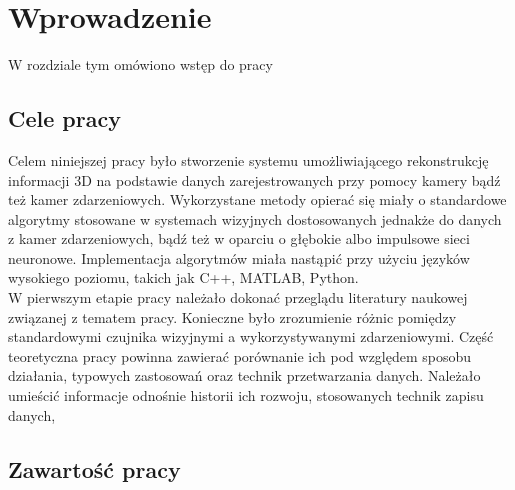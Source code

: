 \chapter{Wprowadzenie}
\label{cha:wprowadzenie}
W rozdziale tym omówiono wstęp do pracy
\section{Cele pracy}
\label{sec:celePracy}
Celem niniejszej pracy było stworzenie systemu umożliwiającego rekonstrukcję informacji 3D na podstawie danych zarejestrowanych przy pomocy kamery bądź też kamer zdarzeniowych. Wykorzystane metody opierać się miały o  standardowe algorytmy stosowane w systemach wizyjnych dostosowanych jednakże do danych z kamer zdarzeniowych, bądź też w oparciu o głębokie albo impulsowe sieci neuronowe. Implementacja algorytmów miała nastąpić przy użyciu języków wysokiego poziomu, takich jak C++, MATLAB, Python.\\
\indent W pierwszym etapie pracy należało dokonać przeglądu literatury naukowej związanej z tematem pracy. Konieczne było zrozumienie różnic pomiędzy standardowymi czujnika wizyjnymi a wykorzystywanymi zdarzeniowymi. Część teoretyczna pracy powinna zawierać porównanie ich pod względem sposobu działania, typowych zastosowań oraz technik przetwarzania danych. Należało umieścić informacje odnośnie historii ich rozwoju, stosowanych technik zapisu danych, 

\section{Zawartość pracy}
\label{sec:zawartoscPracy}


